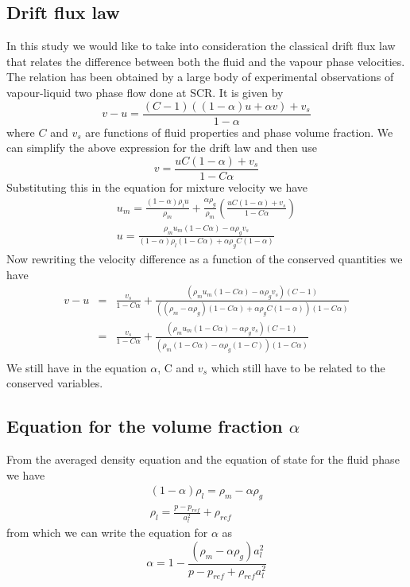 \documentclass[a4paper,16pt]{article}
\begin{document}
\subsection{Drift flux law}
In this study we would like to take into consideration the classical drift flux law that relates the difference between both the fluid and the vapour phase velocities. The relation has been obtained by a large body of experimental observations of vapour-liquid two phase flow done at SCR. It is given by
\begin{equation}
v - u = \frac{(C-1)((1-\alpha)u+\alpha v)+ v_s}{1-\alpha}
\end{equation}
where $C$ and $v_s$ are functions of fluid properties and phase volume fraction. We can simplify the above expression for the drift law and then use
\begin{equation}
v  = \frac{u C(1-\alpha) + v_s}{1-C\alpha}
\end{equation}
Substituting this in the equation for mixture velocity we have
\begin{eqnarray}
u_m = \frac{(1-\alpha)\rho_l u}{\rho_m} + \frac{\alpha \rho_g}{\rho_m}(\frac{u C(1-\alpha) + v_s}{1-C\alpha})\\
u = \frac{\rho_m u_m (1-C\alpha) - \alpha \rho_g v_s}{(1-\alpha)\rho_l(1-C\alpha) + \alpha \rho_g C(1-\alpha)}
\end{eqnarray}
Now rewriting the velocity difference as a function of the conserved quantities we have
\begin{eqnarray}
v - u &=& \frac{v_s}{1-C\alpha} + \frac{(\rho_m u_m(1-C\alpha) - \alpha \rho_g v_s)(C-1)}{((\rho_m - \alpha \rho_g)(1-C\alpha) + \alpha \rho_g C(1-\alpha))(1-C\alpha)}\\
&=& \frac{v_s}{1-C\alpha} + \frac{(\rho_m u_m(1-C\alpha) - \alpha \rho_g v_s)(C-1)}{(\rho_m (1-C\alpha) - \alpha \rho_g (1-C))(1-C\alpha)}\\
\end{eqnarray}
We still have in the equation $\alpha$, C and $v_s$ which still have to be related to the conserved variables.
\subsection{Equation for the volume fraction $\alpha$}
From the averaged density equation and the equation of state for the fluid phase we have
\begin{eqnarray}
(1-\alpha)\rho_l = \rho_m - \alpha \rho_g \\
\rho_l = \frac{p-p_{ref}}{a_l^2} + \rho_{ref}
\end{eqnarray}
from which we can write the equation for $\alpha$ as
\begin{equation}
\alpha = 1 - \frac{(\rho_m - \alpha \rho_g)a_l^2}{p - p_{ref} + \rho_{ref} a_l^2}
\end{equation}
\end{document}
